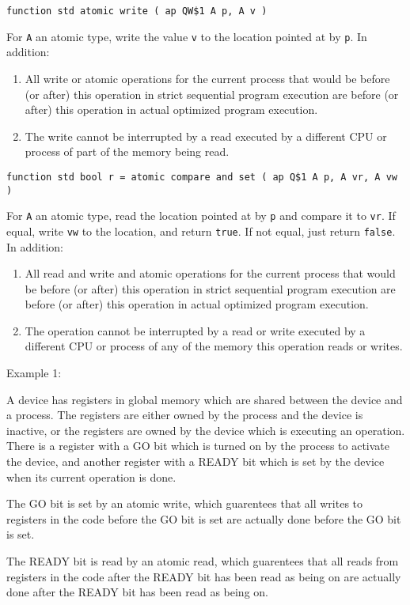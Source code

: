 \documentclass[12pt]{article}
\newenvironment{indpar}[1][0.3in]%
	{\begin{list}{}%
		     {\setlength{\itemsep}{0in}%
		      \setlength{\topsep}{0in}%
		      \setlength{\parsep}{1ex}%
		      \setlength{\labelwidth}{#1}%
		      \setlength{\leftmargin}{#1}%
		      \addtolength{\leftmargin}{\labelsep}}%
	 \item}%
	{\end{list}}
\begin{document}
{\tt function std atomic write ( ap QW\$1 A p, A v )}
\begin{indpar}
For {\tt A} an atomic type,
write the value {\tt v} to the location pointed at by {\tt p}.
In addition:
\begin{enumerate}
\item
All write or atomic operations for the current process that would be
before (or after) this operation in strict sequential program execution
are before (or after) this operation in actual optimized program execution.
\item
The write cannot be interrupted by a read executed by a different CPU
or process of part of the memory being read.
\end{enumerate}
\end{indpar}

{\tt function std bool r =
	atomic compare and set ( ap Q\$1 A p, A vr, A vw )}
\begin{indpar}
For {\tt A} an atomic type,
read the location pointed at by {\tt p} and compare it to {\tt vr}.
If equal, write {\tt vw} to the location, and return {\tt true}.
If not equal, just return {\tt false}.
In addition:
\begin{enumerate}
\item
All read and write and atomic operations for the current process that would be
before (or after) this operation in strict sequential program execution
are before (or after) this operation in actual optimized program execution.
\item
The operation cannot be interrupted by a read or write
executed by a different CPU or process of any of the memory this operation
reads or writes.
\end{enumerate}
\end{indpar}

Example 1:
\begin{indpar}
A device has registers in global memory which are shared between the
device and a process.  The registers are either owned by the process
and the device is inactive, or the registers are owned by the device
which is executing an operation.  There is a register with a GO bit
which is turned on by the process to activate the device, and another
register with a READY bit which is set by the device when its current
operation is done.

The GO bit is set by an atomic write, which guarentees that all writes
to registers in the code before the GO bit is set are actually done
before the GO bit is set.

The READY bit is read by an atomic read, which guarentees that all reads
from registers in the code after the READY bit has been read as being on
are actually done after the READY bit has been read as being on.
\end{indpar}
\end{document}
